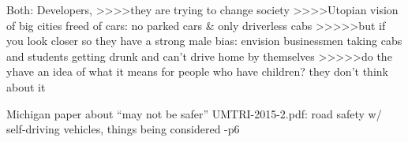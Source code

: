 Both:
Developers, >>>>they are trying to change society
>>>>Utopian vision of big cities freed of cars: no parked cars & only
driverless cabs
>>>>>but if you look closer so they have a strong male bias: envision
businessmen taking cabs and students getting drunk and can't drive
home by themselves
>>>>>do the yhave an idea of what it means for people who have
children? they don't think about it

Michigan paper about ``may not be safer''
UMTRI-2015-2.pdf: road safety w/ self-driving vehicles, things being
considered
-p6

